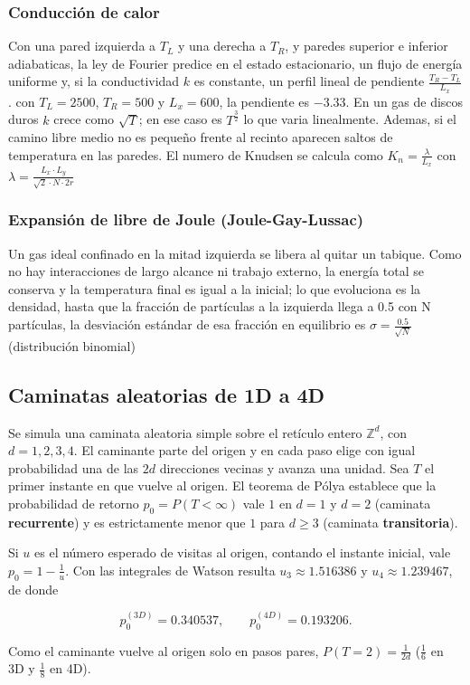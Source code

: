 \documentclass{article}
\begin{document}
\subsubsection{Conducción de calor}
Con una pared izquierda a $T_L$ y una derecha a $T_R$, y paredes superior e inferior adiabaticas, la ley de Fourier predice en el estado estacionario, un flujo de energía uniforme y, si la conductividad $k$ es constante, un perfil lineal de pendiente $\frac{T_R-T_L}{L_x}$. con $T_L=2500$, $T_R=500$ y $L_x=600$, la pendiente es $-3.33$. En un gas de discos duros $k$ crece como $\sqrt{T}$; en ese caso es $T^{\frac{3}{2}}$ lo que varia linealmente. Ademas, si el camino libre medio no es pequeño frente al recinto aparecen saltos de temperatura en las paredes. El numero de Knudsen se calcula como $K_n=\frac{\lambda}{L_x}$ con $\lambda=\frac{L_x\cdot L_y}{\sqrt{2}\cdot N\cdot 2r}$

\subsubsection{Expansión de libre de Joule (Joule-Gay-Lussac)}
Un gas ideal confinado en la mitad izquierda se libera al quitar un tabique. Como no hay interacciones de largo alcance ni trabajo externo, la energía total se conserva y la temperatura final es igual a la inicial; lo que evoluciona es la densidad, hasta que la fracción de partículas a la izquierda llega a 0.5 con N partículas, la desviación estándar de esa fracción en equilibrio es $\sigma=\frac{0.5}{\sqrt{N}}$ (distribución binomial)

\subsection{Caminatas aleatorias de 1D a 4D}
Se simula una caminata aleatoria simple sobre el retículo entero $\mathbb{Z}^d$, con $d=1,2,3,4$. El caminante parte del origen y en cada paso elige con igual probabilidad una de las $2d$ direcciones vecinas y avanza una unidad. Sea $T$ el primer instante en que vuelve al origen. El teorema de Pólya establece que la probabilidad de retorno $p_0=P(T<\infty)$ vale $1$ en $d=1$ y $d=2$ (caminata \textbf{recurrente}) y es estrictamente menor que $1$ para $d\geq3$ (caminata \textbf{transitoria}).

Si $u$ es el número esperado de visitas al origen, contando el instante inicial, vale $p_0=1-\frac{1}{u}$. Con las integrales de Watson resulta $u_3\approx1.516386$ y $u_4\approx1.239467$, de donde
\begin{center}
    $$p_0^{(3D)}=0.340537,\qquad p_0^{(4D)}=0.193206.$$
\end{center}
Como el caminante vuelve al origen solo en pasos pares, $P(T=2)=\frac{1}{2d}$ ($\frac{1}{6}$ en 3D y $\frac{1}{8}$ en 4D).
\end{document}
